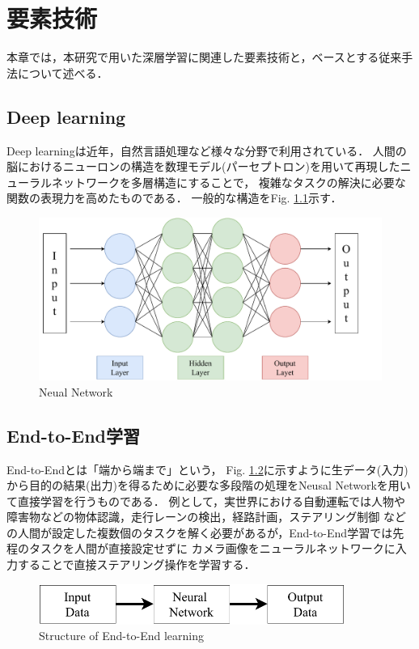 \chapter{要素技術}
本章では，本研究で用いた深層学習に関連した要素技術と，ベースとする従来手法について述べる．

\section{Deep learning}
Deep learningは近年，自然言語処理など様々な分野で利用されている．
人間の脳におけるニューロンの構造を数理モデル(パーセプトロン)を用いて再現したニューラルネットワークを多層構造にすることで，
複雑なタスクの解決に必要な関数の表現力を高めたものである．
一般的な構造をFig. \ref{fig::network}示す．

\begin{figure}[h]
    \centering
    \includegraphics[width = 12cm]{./figs/net.pdf}
    \caption{Neual Network}
    \label{fig::network}
\end{figure}

\section{End-to-End学習}
End-to-Endとは「端から端まで」という，
Fig. \ref{fig::e2e}に示すように生データ(入力)から目的の結果(出力)を得るために必要な多段階の処理をNeusal Networkを用いて直接学習を行うものである．
例として，実世界における自動運転では人物や障害物などの物体認識，走行レーンの検出，経路計画，ステアリング制御
などの人間が設定した複数個のタスクを解く必要があるが，End-to-End学習では先程のタスクを人間が直接設定せずに
カメラ画像をニューラルネットワークに入力することで直接ステアリング操作を学習する．

\vspace{2.0zh}
\begin{figure}[h]
    \centering
    \includegraphics[width = 10cm]{./figs/e2e.pdf}
    \caption{Structure of End-to-End learning}
    \label{fig::e2e}
\end{figure}

